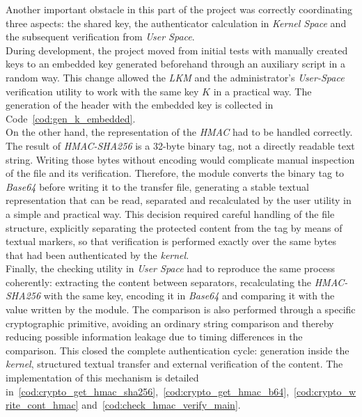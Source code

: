 Another important obstacle in this part of the project was correctly coordinating three aspects: the shared key, the authenticator calculation in \textit{Kernel Space} and the subsequent verification from \textit{User Space}.\\

During development, the project moved from initial tests with manually created keys to an embedded key generated beforehand through an auxiliary script in a random way.
This change allowed the \textit{LKM} and the administrator's \textit{User-Space} verification utility to work with the same key \(K\) in a practical way.
The generation of the header with the embedded key is collected in Code~\ref{cod:gen_k_embedded}.\\

On the other hand, the representation of the \textit{HMAC} had to be handled correctly.
The result of \textit{HMAC-SHA256} is a 32-byte binary tag, not a directly readable text string.
Writing those bytes without encoding would complicate manual inspection of the file and its verification.
Therefore, the module converts the binary tag to \textit{Base64} before writing it to the transfer file, generating a stable textual representation that can be read, separated and recalculated by the user utility in a simple and practical way.
This decision required careful handling of the file structure, explicitly separating the protected content from the tag by means of textual markers, so that verification is performed exactly over the same bytes that had been authenticated by the \textit{kernel}.\\

Finally, the checking utility in \textit{User Space} had to reproduce the same process coherently: extracting the content between separators, recalculating the \textit{HMAC-SHA256} with the same key, encoding it in \textit{Base64} and comparing it with the value written by the module.
The comparison is also performed through a specific cryptographic primitive, avoiding an ordinary string comparison and thereby reducing possible information leakage due to timing differences in the comparison.
This closed the complete authentication cycle: generation inside the \textit{kernel}, structured textual transfer and external verification of the content.
The implementation of this mechanism is detailed in~\ref{cod:crypto_get_hmac_sha256},~\ref{cod:crypto_get_hmac_b64},~\ref{cod:crypto_write_cont_hmac} and~\ref{cod:check_hmac_verify_main}.\\\\

